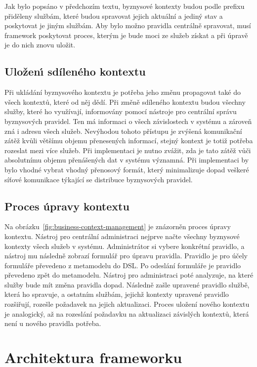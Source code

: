 Jak bylo popsáno v předchozím textu, byznysové kontexty budou podle prefixu přiděleny službám,
které budou spravovat jejich aktuální a jediný stav a poskytovat je jiným službám. Aby bylo
možno pravidla centrálně spravovat, musí framework poskytovat proces, kterým je bude moci ze
služeb získat a při úpravě je do nich znovu uložit.

\subsection{Uložen\'{\i} sdíleného kontextu}\label{sec:saving-context}

Při ukládání byznysového kontextu je potřeba jeho změnu propagovat také do všech kontextů, které od něj dědí.
Při změně sdíleného kontextu budou všechny služby, které ho využívají, informovány pomocí nástroje pro
centrální správu byznysových pravidel. Ten má informaci o všech závislostech v systému a zároveň zná i adresu všech
služeb. Nevýhodou tohoto přístupu je zvýšená komunikační zátěž kvůli většímu objemu přenesených informací, stejný kontext
je totiž potřeba rozeslat mezi více služeb. Při implementaci je nutno zvážit, zda je tato zátěž vůči absolutnímu objemu
přenášených dat v systému významná. Při implementaci by bylo vhodné vybrat vhodný přenosový formát, který minimalizuje dopad
veškeré síťové komunikace týkající se distribuce byznysových pravidel.

\subsection{Proces úpravy kontextu}

Na obrázku~\ref{fig:business-context-management} je znázorněn proces úpravy kontextu. Nástroj pro
centrální administraci nejprve načte všechny byznysové kontexty všech služeb v systému. Administrátor
si vybere konkrétní pravidlo, a nástroj mu následně zobrazí formulář pro úpravu pravidla.
Pravidlo je pro účely formuláře převedeno z metamodelu do \gls{DSL}. Po odeslání formuláře je pravidlo
převedeno zpět do metamodelu. Nástroj pro administraci poté analyzuje, na které služby bude mít změna pravidla
dopad. Následně zašle upravené pravidlo službě, která ho spravuje, a ostatním službám, jejichž kontexty upravené
pravidlo rozšiřují, rozešle požadavek na jejich aktualizaci. Proces uložení nového kontextu je analogický, až na
rozeslání požadavku na aktualizaci závislých kontextů, která není u nového pravidla potřeba.

\section{Architektura frameworku}\label{sec:architecture}

